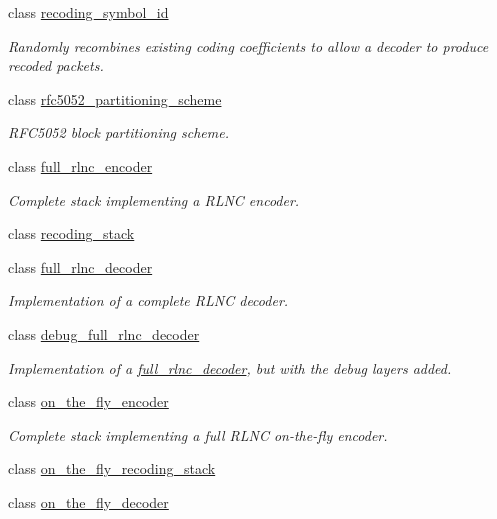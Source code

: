 \begin{DoxyCompactItemize}
class \hyperlink{classkodo_1_1recoding__symbol__id}{recoding\-\_\-symbol\-\_\-id}
\begin{DoxyCompactList}\small\item\em Randomly recombines existing coding coefficients to allow a decoder to produce recoded packets. \end{DoxyCompactList}\item 
class \hyperlink{classkodo_1_1rfc5052__partitioning__scheme}{rfc5052\-\_\-partitioning\-\_\-scheme}
\begin{DoxyCompactList}\small\item\em R\-F\-C5052 block partitioning scheme. \end{DoxyCompactList}\item 
class \hyperlink{classkodo_1_1full__rlnc__encoder}{full\-\_\-rlnc\-\_\-encoder}
\begin{DoxyCompactList}\small\item\em Complete stack implementing a R\-L\-N\-C encoder. \end{DoxyCompactList}\item 
class \hyperlink{classkodo_1_1recoding__stack}{recoding\-\_\-stack}
\item 
class \hyperlink{classkodo_1_1full__rlnc__decoder}{full\-\_\-rlnc\-\_\-decoder}
\begin{DoxyCompactList}\small\item\em Implementation of a complete R\-L\-N\-C decoder. \end{DoxyCompactList}\item 
class \hyperlink{classkodo_1_1debug__full__rlnc__decoder}{debug\-\_\-full\-\_\-rlnc\-\_\-decoder}
\begin{DoxyCompactList}\small\item\em Implementation of a \hyperlink{classkodo_1_1full__rlnc__decoder}{full\-\_\-rlnc\-\_\-decoder}, but with the debug layers added. \end{DoxyCompactList}\item 
class \hyperlink{classkodo_1_1on__the__fly__encoder}{on\-\_\-the\-\_\-fly\-\_\-encoder}
\begin{DoxyCompactList}\small\item\em Complete stack implementing a full R\-L\-N\-C on-\/the-\/fly encoder. \end{DoxyCompactList}\item 
class \hyperlink{classkodo_1_1on__the__fly__recoding__stack}{on\-\_\-the\-\_\-fly\-\_\-recoding\-\_\-stack}
\item 
class \hyperlink{classkodo_1_1on__the__fly__decoder}{on\-\_\-the\-\_\-fly\-\_\-decoder}

\end{DoxyCompactItemize}
